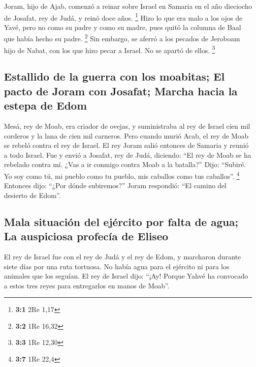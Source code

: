  Joram, hijo de Ajab, comenzó a reinar sobre Israel en
Samaria en el año dieciocho de Josafat, rey de Judá, y reinó doce años.
\footnote{\textbf{3:1} 2Re 1,17}  Hizo lo que era malo a
los ojos de Yavé, pero no como su padre y como su madre, pues quitó la
columna de Baal que había hecho su padre. \footnote{\textbf{3:2} 1Re
  16,32}  Sin embargo, se aferró a los pecados de Jeroboam
hijo de Nabat, con los que hizo pecar a Israel. No se apartó de ellos.
\footnote{\textbf{3:3} 1Re 12,30}

\hypertarget{estallido-de-la-guerra-con-los-moabitas-el-pacto-de-joram-con-josafat-marcha-hacia-la-estepa-de-edom}{%
\subsection{Estallido de la guerra con los moabitas; El pacto de Joram
con Josafat; Marcha hacia la estepa de
Edom}\label{estallido-de-la-guerra-con-los-moabitas-el-pacto-de-joram-con-josafat-marcha-hacia-la-estepa-de-edom}}

 Mesá, rey de Moab, era criador de ovejas, y suministraba
al rey de Israel cien mil corderos y la lana de cien mil carneros.
 Pero cuando murió Acab, el rey de Moab se rebeló contra
el rey de Israel.  El rey Joram salió entonces de Samaria
y reunió a todo Israel.  Fue y envió a Josafat, rey de
Judá, diciendo: ``El rey de Moab se ha rebelado contra mí. ¿Vas a ir
conmigo contra Moab a la batalla?'' Dijo: ``Subiré. Yo soy como tú, mi
pueblo como tu pueblo, mis caballos como tus caballos''. \footnote{\textbf{3:7}
  1Re 22,4}  Entonces dijo: ``¿Por dónde subiremos?''
Joram respondió: ``El camino del desierto de Edom''.

\hypertarget{mala-situaciuxf3n-del-ejuxe9rcito-por-falta-de-agua-la-auspiciosa-profecuxeda-de-eliseo}{%
\subsection{Mala situación del ejército por falta de agua; La auspiciosa
profecía de
Eliseo}\label{mala-situaciuxf3n-del-ejuxe9rcito-por-falta-de-agua-la-auspiciosa-profecuxeda-de-eliseo}}

 El rey de Israel fue con el rey de Judá y el rey de Edom,
y marcharon durante siete días por una ruta tortuosa. No había agua para
el ejército ni para los animales que los seguían.  El rey
de Israel dijo: ``¡Ay! Porque Yahvé ha convocado a estos tres reyes para
entregarlos en manos de Moab''.

